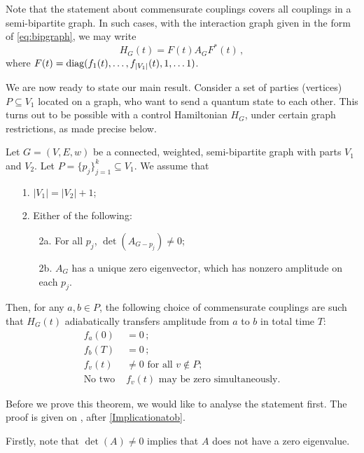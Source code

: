 Note that the statement about commensurate couplings covers all couplings in a semi-bipartite graph. In such cases, with the interaction graph given in the form of \cref{eq:bipgraph}, we may write
\begin{equation}\label{Hamiltonianasconjugateadjacency}
H_G(t) = F(t) A_G F^*(t)\,,
\end{equation} 
where $F(t) = \mathop{\textup{diag}} (f_1(t), \dotsc , f_{|V_1|}(t), 1, \dotsc 1)$. 


We are now ready to state our main result. Consider a set of parties (vertices) $P\subseteq V_1$ located on a graph, who want to send a quantum state to each other. This turns out to be possible with a control Hamiltonian $H_G$, under certain graph restrictions, as made precise below. 

\begin{theorem}
\label{thm:transfer}
Let $G = (V,E,w)$ be a connected, weighted, semi-bipartite graph with parts $V_1$ and $V_2$. Let $P = \{p_j\}_{j=1}^k \subseteq V_1$. We assume that
\begin{itemize}
\item[1.] $|V_1| = |V_2| + 1$;
\item[2.] Either of the following:
\begin{itemize}
\item[2a.] For all $p_j$, $\det(A_{G-p_j}) \neq 0$;
\item[2b.] $A_G$ has a unique zero eigenvector, which has nonzero amplitude on each $p_j$.
\end{itemize}
\end{itemize}
Then, for any $a, b \in P$, the following choice of commensurate couplings are such that $H_G(t)$ adiabatically transfers amplitude from $a$ to $b$ in total time $T$:
\begin{equation}
\begin{split}
f_a(0) &= 0 \,; \\
f_b(T) &= 0 \,; \\
f_v(t) &\neq 0 \text{ for all $v \not \in P$;}\\
\text{No two }&\text{$f_v(t) $ may be zero simultaneously.}
\end{split}
\label{eqn:control_scheme} 
\end{equation}
\end{theorem}
%
Before we prove this theorem, we would like to analyse the statement first. The proof is given on , after \cref{Implicationatob}.

Firstly, note that $\det(A) \neq 0$ implies that $A$ does not have a zero eigenvalue. 

